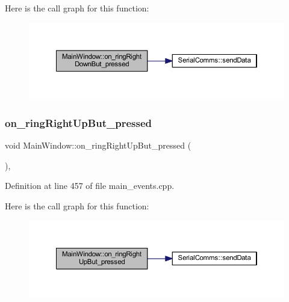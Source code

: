 Here is the call graph for this function\+:
\nopagebreak
\begin{figure}[H]
\begin{center}
\leavevmode
\includegraphics[width=350pt]{class_main_window_a2a0d4d64e7fe2ee99abce8e41eb4afd1_cgraph}
\end{center}
\end{figure}
\mbox{\label{class_main_window_a91f17268d2e2d4ac1b10c37a535a93fe}} 
\subsubsection{\texorpdfstring{on\_ringRightUpBut\_pressed}{on\_ringRightUpBut\_pressed}}
{\footnotesize\ttfamily void Main\+Window\+::on\+\_\+ring\+Right\+Up\+But\+\_\+pressed (\begin{DoxyParamCaption}{ }\end{DoxyParamCaption})\hspace{0.3cm}{\ttfamily [private]}, {\ttfamily [slot]}}



Definition at line 457 of file main\+\_\+events.\+cpp.

Here is the call graph for this function\+:
\nopagebreak
\begin{figure}[H]
\begin{center}
\leavevmode
\includegraphics[width=350pt]{class_main_window_a91f17268d2e2d4ac1b10c37a535a93fe_cgraph}
\end{center}
\end{figure}
\mbox{\label{class_main_window_aa663ee1d7e10715e4998923eb87e5d15}} 
